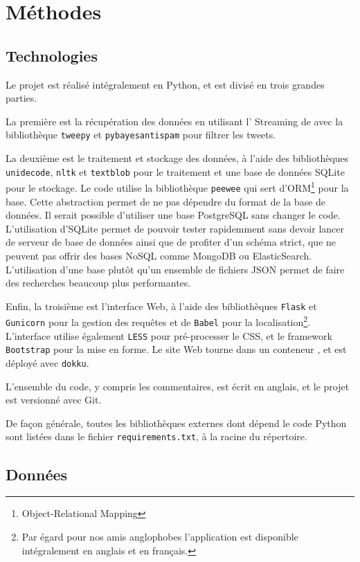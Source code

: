 
\section{Méthodes}

\subsection{Technologies}

Le projet est réalisé intégralement en Python, et est divisé en trois grandes
parties.

La première est la récupération des données en utilisant l’\api{} Streaming de
\twt{} avec la bibliothèque \verb|tweepy| et \verb|pybayesantispam| pour
filtrer les tweets.


La deuxième est le traitement et stockage des données, à l’aide des
bibliothèques \verb|unidecode|, \verb|nltk| et \verb|textblob| pour le
traitement et une base de données SQLite pour le stockage. Le code utilise la
bibliothèque \verb|peewee| qui sert d’ORM\footnote{Object-Relational Mapping}
pour la base. Cette abstraction permet de ne pas dépendre du format de la base
de données. Il serait possible d’utiliser une base PostgreSQL sans changer le
code. L’utilisation d’SQLite permet de pouvoir tester rapidemment sans devoir
lancer de serveur de base de données ainsi que de profiter d’un schéma strict,
que ne peuvent pas offrir des bases NoSQL comme MongoDB ou ElasticSearch.
L’utilisation d’une base plutôt qu’un ensemble de fichiers JSON permet de faire
des recherches beaucoup plus performantes.

Enfin, la troisième est l’interface Web, à l’aide des bibliothèques
\verb|Flask| et \verb|Gunicorn| pour la gestion des requêtes et de \verb|Babel|
pour la localisation\footnote{Par égard pour nos amis anglophobes l’application
est disponible intégralement en anglais et en français.}. L’interface utilise
également \verb|LESS| pour pré-processer le CSS, et le framework
\verb|Bootstrap| pour la mise en forme. Le site Web tourne dans un conteneur
, et est déployé avec \verb|dokku|.

L’ensemble du code, y compris les commentaires, est écrit en anglais, et le
projet est versionné avec Git.

De façon générale, toutes les bibliothèques externes dont dépend le code Python
sont listées dans le fichier \verb|requirements.txt|, à la racine du
répertoire.

\subsection{Données}

